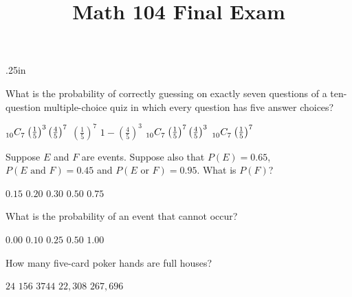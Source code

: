 \documentclass[answers,12pt]{exam}
\title{Math 104 Final Exam}
\date{}\author{}
\newcommand\ncr[2]{\tensor[_{#1}]C{_{#2}}}
\begin{document}
\maketitle
\begin{center}
\end{center}

\begin{questions}\itemsep.25in

\question What is the probability of correctly guessing
on exactly seven questions of a ten-question multiple-choice quiz
in which every question has five answer choices?\\
\begin{oneparchoices}
\choice $\textstyle\ncr{10}{7}\left(\frac{1}{5}\right)^3
\left(\frac{4}{5}\right)^7$
\choice $\textstyle\left(\frac{1}{5}\right)^7$
\choice $\textstyle 1-\left(\frac{4}{5}\right)^3$
\correctchoice $\textstyle\ncr{10}{7}\left(\frac{1}{5}\right)^7
\left(\frac{4}{5}\right)^3$
\choice $\textstyle\ncr{10}{7}\left(\frac{1}{5}\right)^7$
\end{oneparchoices}

\question Suppose $E$ and $F$ are events.
Suppose also that $P\left(E\right)=0.65$,
$P\left(\text{$E$ and $F$}\right)=0.45$
and $P\left(\text{$E$ or $F$}\right)=0.95$. What
is $P\left(F\right)$?\\
\begin{oneparchoices}
\choice $0.15$ %
\choice $0.20$ %
\choice $0.30$ %
\choice $0.50$ %
\correctchoice $0.75$
\end{oneparchoices}

\question What is the probability
of an event that cannot occur?\\
\begin{oneparchoices}
\correctchoice $0.00$
\choice $0.10$
\choice $0.25$
\choice $0.50$
\choice $1.00$
\end{oneparchoices}

\question How many five-card poker hands are full houses?\\
\begin{oneparchoices}
\choice $24$ %
\choice $156$ %
\correctchoice $3744$
\choice $22,308$ %
\choice $267,696$ %
\end{oneparchoices}


\end{questions}
\end{document}
